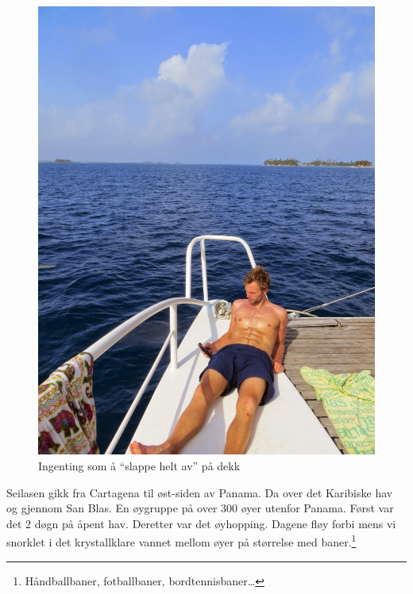 \begin{figure}[H]
	\centering
	\includegraphics[width=\textwidth]{flex}
	\caption*{Ingenting som å ``slappe helt av'' på dekk}
	\label{fig:tintin}
\end{figure}
Seilasen gikk fra Cartagena til øst-siden av Panama. Da over det
Karibiske hav og gjennom San Blas. En øygruppe på over 300 øyer
utenfor Panama. Først var det 2 døgn på åpent hav. Deretter var det
øyhopping. Dagene fløy forbi mens vi snorklet i det krystallklare vannet
mellom øyer på størrelse med baner.\footnote{Håndballbaner,
fotballbaner, bordtennisbaner\ldots }


\clearpage
